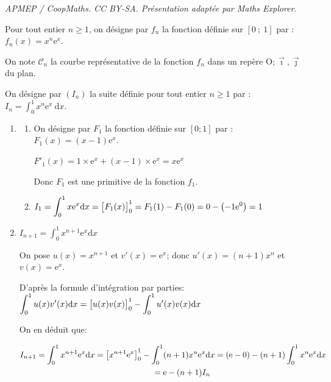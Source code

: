 \documentclass[10pt]{article}
\providecommand{\e}{{\mathrm{e}}}
\renewcommand{\d}{{\mathrm{d}}}
\providecommand{\ds}{\displaystyle}
\providecommand{\Oij}{\(\mathrm{O};\vec{\imath},\vec{\jmath}\)}
\begin{document}
\noindent\textit{APMEP / CoopMaths. CC BY-SA. Présentation adaptée par Maths Explorer.}\par\medskip
\medskip


\medskip

Pour tout entier $n\geqslant 1$, on désigne par $f_{n}$ la fonction définie sur $[0~;~1]$ par :
$f_{n}(x) = x^{n} \e^{x}$.

On note $\mathcal{C}_{n}$ la courbe représentative de la fonction $f_{n}$ dans un repère \Oij{} du plan.

On désigne par $\left(I_{n}\right)$ la suite définie pour tout entier $n\geqslant 1$ par :
$I_{n} =\ds \int_{0}^{1} x^{n} \e^{x} \mathrm{~d} x.$

\begin{enumerate}
\item 
	\begin{enumerate}
		\item On désigne par $F_{1}$ la fonction définie sur $[0 ; 1]$ par : $F_{1}(x) = (x-1) \e^{x}.$

$F'_1(x)=1\times \e^{x} + (x-1)\times \e^{x} = x\e^{x}$

Donc $F_{1}$ est une primitive de la fonction $f_{1}$.

		\item $I_{1} = \ds \int_{0}^{1} x \e^{x} \d x = \left [ F_1(x)\strut\right ]_{0}^{1}= F_1(1)-F_1(0) = 0- \left (-1\e^{0}\right )=1$
		
	\end{enumerate}
	
\item 
$I_{n+1}=\ds\int_{0}^{1} x^{n+1}\e^{x}\d x$

On pose $u(x)=x^{n+1}$ et $v'(x)=\e^{x}$; donc $u'(x)=(n+1)x^n$ et $v(x)=\e^{x}$.

D'après la formule d'intégration par parties:\\
$\ds\int_{0}^{1} u(x)v'(x) \d x =  \left [ u(x)v(x)\strut \right ]_{0}^{1} - \ds\int_{0}^{1} u'(x)v(x)\d x$

On en déduit que:

$\begin{gathered}I_{n+1}=\ds\int_{0}^{1} x^{n+1}\e^{x} \d x =  \left [ x^{n+1}\e^{x}\strut \right ]_{0}^{1} - \ds\int_{0}^{1} (n+1)x^n \e^{x}\d x
= (\e - 0) - (n+1) \ds\int_{0}^{1} x^n \e^{x} \d x\\
\phantom{I_{n+1}}
= \e -(n+1) I_{n}\end{gathered}$


\end{enumerate}
\end{document}
